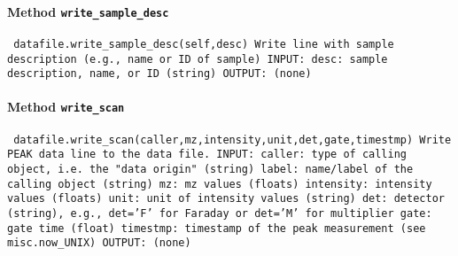 \paragraph{Method \texttt{write_sample_desc}}
\vspace{1ex}
\texttt{\newline
datafile.write_sample_desc(self,desc)\newline
\newline
Write line with sample description (e.g., name or ID of sample)\newline
\newline
INPUT:\newline
desc: sample description, name, or ID (string)\newline
\newline
OUTPUT:\newline
(none)\newline
\newline
}

\paragraph{Method \texttt{write_scan}}
\vspace{1ex}
\texttt{\newline
datafile.write_scan(caller,mz,intensity,unit,det,gate,timestmp)\newline
\newline
Write PEAK data line to the data file.\newline
\newline
INPUT:\newline
caller: type of calling object, i.e. the "data origin" (string)\newline
label: name/label of the calling object (string)\newline
mz: mz values (floats)\newline
intensity: intensity values (floats)\newline
unit: unit of intensity values (string)\newline
det: detector (string), e.g., det='F' for Faraday or det='M' for multiplier\newline
gate: gate time (float)\newline
timestmp: timestamp of the peak measurement (see misc.now_UNIX)\newline
\newline
OUTPUT:\newline
(none)\newline
\newline
}


